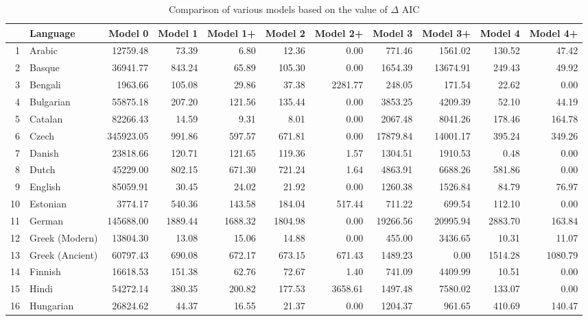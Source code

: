 \documentclass[a4paper]{article}
\begin{document}
\pagestyle{empty}
\begin{table}
\caption{Comparison of various models based on the value of $\Delta$ AIC} \label{table:NSFAccuDivBG}%
\centering
\begin{tabular}{rlrrrrrrrrr}
  \hline
 & Language & Model 0 & Model 1 & Model 1+ & Model 2 & Model 2+ & Model 3 & Model 3+ & Model 4 & Model 4+ \\ 
  \hline
1 & Arabic & 12759.48 & 73.39 & 6.80 & 12.36 & 0.00 & 771.46 & 1561.02 & 130.52 & 47.42 \\ 
  2 & Basque & 36941.77 & 843.24 & 65.89 & 105.30 & 0.00 & 1654.39 & 13674.91 & 249.43 & 49.92 \\ 
  3 & Bengali & 1963.66 & 105.08 & 29.86 & 37.38 & 2281.77 & 248.05 & 171.54 & 22.62 & 0.00 \\ 
  4 & Bulgarian & 55875.18 & 207.20 & 121.56 & 135.44 & 0.00 & 3853.25 & 4209.39 & 52.10 & 44.19 \\ 
  5 & Catalan & 82266.43 & 14.59 & 9.31 & 8.01 & 0.00 & 2067.48 & 8041.26 & 178.46 & 164.78 \\ 
  6 & Czech & 345923.05 & 991.86 & 597.57 & 671.81 & 0.00 & 17879.84 & 14001.17 & 395.24 & 349.26 \\ 
  7 & Danish & 23818.66 & 120.71 & 121.65 & 119.36 & 1.57 & 1304.51 & 1910.53 & 0.48 & 0.00 \\ 
  8 & Dutch & 45229.00 & 802.15 & 671.30 & 721.24 & 1.64 & 4863.91 & 6688.26 & 581.86 & 0.00 \\ 
  9 & English & 85059.91 & 30.45 & 24.02 & 21.92 & 0.00 & 1260.38 & 1526.84 & 84.79 & 76.97 \\ 
  10 & Estonian & 3774.17 & 540.36 & 143.58 & 184.04 & 517.44 & 711.22 & 699.54 & 112.10 & 0.00 \\ 
  11 & German & 145688.00 & 1889.44 & 1688.32 & 1804.98 & 0.00 & 19266.56 & 20995.94 & 2883.70 & 163.84 \\ 
  12 & Greek (Modern) & 13804.30 & 13.08 & 15.06 & 14.88 & 0.00 & 455.00 & 3436.65 & 10.31 & 11.07 \\ 
  13 & Greek (Ancient) & 60797.43 & 690.08 & 672.17 & 673.15 & 671.43 & 1489.23 & 0.00 & 1514.28 & 1080.79 \\ 
  14 & Finnish & 16618.53 & 151.38 & 62.76 & 72.67 & 1.40 & 741.09 & 4409.99 & 10.51 & 0.00 \\ 
  15 & Hindi & 54272.14 & 380.35 & 200.82 & 177.53 & 3658.61 & 1497.48 & 7580.02 & 133.07 & 0.00 \\ 
  16 & Hungarian & 26824.62 & 44.37 & 16.55 & 21.37 & 0.00 & 1204.37 & 961.65 & 410.69 & 140.47 \\ 

\end{tabular}
\end{table}
\end{document}
